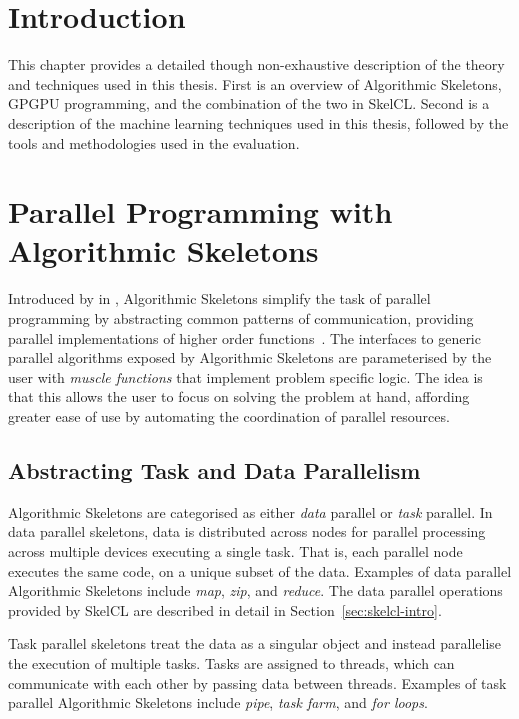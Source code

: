 \section{Introduction}

This chapter provides a detailed though non-exhaustive description of
the theory and techniques used in this thesis. First is an overview of
Algorithmic Skeletons, GPGPU programming, and the combination of the
two in SkelCL. Second is a description of the machine learning
techniques used in this thesis, followed by the tools and
methodologies used in the evaluation.


\section{Parallel Programming with Algorithmic Skeletons}

Introduced by \citeauthor{Cole1989} in \citeyear{Cole1989},
Algorithmic Skeletons simplify the task of parallel programming by
abstracting common patterns of communication, providing parallel
implementations of higher order functions~\cite{Cole1989}. The
interfaces to generic parallel algorithms exposed by Algorithmic
Skeletons are parameterised by the user with \emph{muscle functions}
that implement problem specific logic. The idea is that this allows
the user to focus on solving the problem at hand, affording greater
ease of use by automating the coordination of parallel resources.


\subsection{Abstracting Task and Data Parallelism}

Algorithmic Skeletons are categorised as either \emph{data} parallel
or \emph{task} parallel. In data parallel skeletons, data is
distributed across nodes for parallel processing across multiple
devices executing a single task. That is, each parallel node executes
the same code, on a unique subset of the data. Examples of data
parallel Algorithmic Skeletons include \emph{map}, \emph{zip}, and
\emph{reduce}. The data parallel operations provided by SkelCL are
described in detail in Section~\ref{sec:skelcl-intro}.

Task parallel skeletons treat the data as a singular object and
instead parallelise the execution of multiple tasks. Tasks are
assigned to threads, which can communicate with each other by passing
data between threads. Examples of task parallel Algorithmic Skeletons
include \emph{pipe}, \emph{task farm}, and \emph{for loops}.


